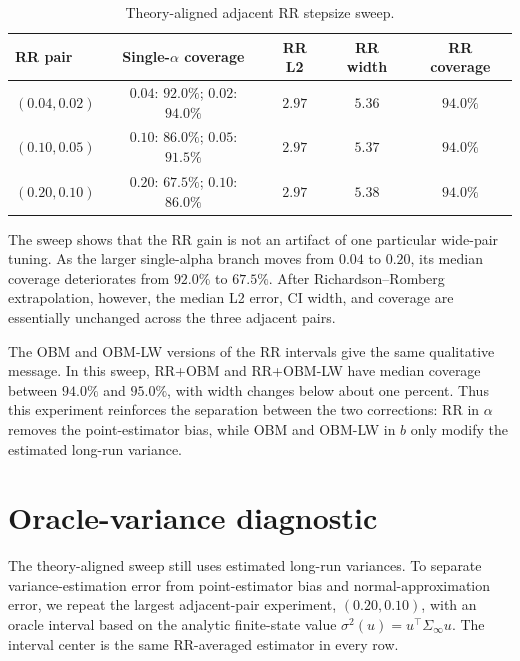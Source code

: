 \begin{table}[htbp]
\caption{Theory-aligned adjacent RR stepsize sweep.}
\centering
\small
\begin{tabular}{lcccc}
\toprule
\textbf{RR pair} & \textbf{Single-$\alpha$ coverage} & \textbf{RR L2}
& \textbf{RR width} & \textbf{RR coverage} \\
\midrule
$(0.04,0.02)$ & $0.04$: $92.0\%$; $0.02$: $94.0\%$ & $2.97$ & $5.36$ & $94.0\%$ \\
$(0.10,0.05)$ & $0.10$: $86.0\%$; $0.05$: $91.5\%$ & $2.97$ & $5.37$ & $94.0\%$ \\
$(0.20,0.10)$ & $0.20$: $67.5\%$; $0.10$: $86.0\%$ & $2.97$ & $5.38$ & $94.0\%$ \\
\bottomrule
\end{tabular}
\end{table}

The sweep shows that the RR gain is not an artifact of one particular
wide-pair tuning. As the larger single-alpha branch moves from $0.04$ to
$0.20$, its median coverage deteriorates from $92.0\%$ to $67.5\%$. After
Richardson--Romberg extrapolation, however, the median L2 error, CI width,
and coverage are essentially unchanged across the three adjacent pairs.

The OBM and OBM-LW versions of the RR intervals give the same qualitative
message. In this sweep, RR+OBM and RR+OBM-LW have median coverage between
$94.0\%$ and $95.0\%$, with width changes below about one percent. Thus this
experiment reinforces the separation between the two corrections: RR in
$\alpha$ removes the point-estimator bias, while OBM and OBM-LW in $b$ only
modify the estimated long-run variance.

\section{Oracle-variance diagnostic}

The theory-aligned sweep still uses estimated long-run variances. To separate
variance-estimation error from point-estimator bias and normal-approximation
error, we repeat the largest adjacent-pair experiment, $(0.20,0.10)$, with
an oracle interval based on the analytic finite-state value
$\sigma^2(u)=u^\top\Sigma_\infty u$. The interval center is the same
RR-averaged estimator in every row.

